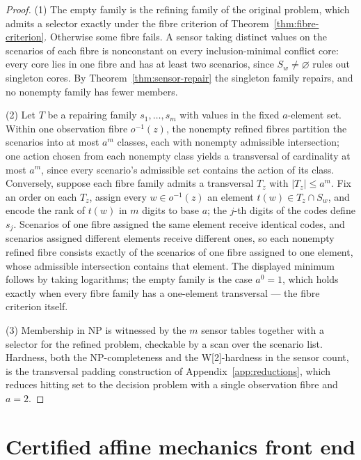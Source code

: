 \documentclass[11pt]{article}
\theoremstyle{plain}
\theoremstyle{definition}
\theoremstyle{remark}
\begin{document}
\begin{proof}
(1) The empty family is the refining family of the original problem, which
admits a selector exactly under the fibre criterion of
Theorem~\ref{thm:fibre-criterion}.  Otherwise some fibre fails.  A sensor
taking distinct values on the scenarios of each fibre is nonconstant on every
inclusion-minimal conflict core: every core lies in one fibre and has at
least two scenarios, since \(S_w\ne\varnothing\) rules out singleton cores.
By Theorem~\ref{thm:sensor-repair} the singleton family repairs, and no
nonempty family has fewer members.

(2) Let \(T\) be a repairing family \(s_1,\dots,s_m\) with values in the
fixed \(a\)-element set.  Within one observation fibre \(o^{-1}(z)\), the
nonempty refined fibres partition the scenarios into at most \(a^m\) classes,
each with nonempty admissible intersection; one action chosen from each
nonempty class yields a transversal of cardinality at most \(a^m\), since
every scenario's admissible set contains the action of its class.
Conversely, suppose each fibre family admits a transversal \(T_z\) with
\(|T_z|\le a^m\).  Fix an order on each \(T_z\), assign every
\(w\in o^{-1}(z)\) an element \(t(w)\in T_z\cap S_w\), and encode the rank
of \(t(w)\) in \(m\) digits to base \(a\); the \(j\)-th digits of the codes
define \(s_j\).  Scenarios of one fibre assigned the same element receive
identical codes, and scenarios assigned different elements receive different
ones, so each nonempty refined fibre consists exactly of the scenarios of one
fibre assigned to one element, whose admissible intersection contains that
element.  The displayed minimum follows by taking logarithms; the empty
family is the case \(a^0=1\), which holds exactly when every fibre family
has a one-element transversal --- the fibre criterion itself.

(3) Membership in NP is witnessed by the \(m\) sensor tables together with a
selector for the refined problem, checkable by a scan over the scenario list.
Hardness, both the NP-completeness and the W[2]-hardness in the sensor count,
is the transversal padding construction of
Appendix~\ref{app:reductions}, which reduces hitting set to the decision
problem with a single observation fibre and \(a=2\).
\end{proof}

\section{Certified affine mechanics front end}
\label{sec:mechanics-front-end}
\end{document}
